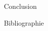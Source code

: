 \documentclass[8pt]{beamer}
\begin{document}
\begin{frame}{Conclusion}
\end{frame}


\begin{frame}{Bibliographie}
    \nocite{*}
    
\end{frame}
\addtocounter{framenumber}{-1}
\end{document}

